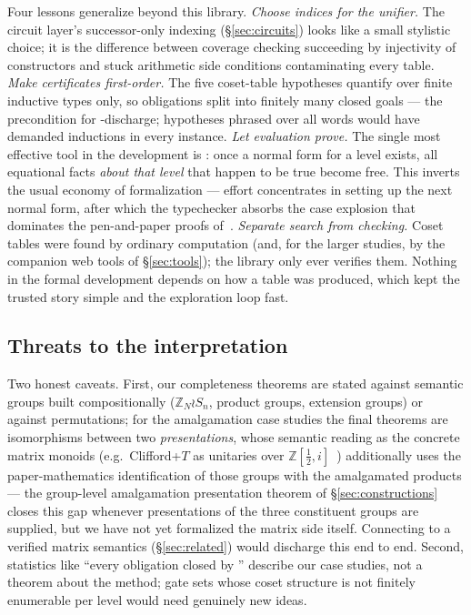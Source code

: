 Four lessons generalize beyond this library.  \emph{Choose indices for
the unifier.}  The circuit layer's successor-only indexing
(\S\ref{sec:circuits}) looks like a small stylistic choice; it is the
difference between coverage checking succeeding by injectivity of
constructors and stuck arithmetic side conditions contaminating every
table.  \emph{Make certificates first-order.}  The five coset-table
hypotheses quantify over finite inductive types only, so obligations
split into finitely many closed goals --- the precondition for
-discharge; hypotheses phrased over all words would have
demanded inductions in every instance.  \emph{Let evaluation prove.}
The single most effective tool in the development is
: once a normal form for a level exists, all
equational facts \emph{about that level} that happen to be true become
free.  This inverts the usual economy of formalization --- effort
concentrates in setting up the next normal form, after which the
typechecker absorbs the case explosion that dominates the pen-and-paper
proofs of~\cite{selinger2015clifford,li2025qutrit,
clement2026realcliffordch}.  \emph{Separate search from checking.}  Coset
tables were found by ordinary computation (and, for the larger studies,
by the companion web tools of \S\ref{sec:tools}); the library only ever
verifies them.  Nothing in the formal development depends on how a table
was produced, which kept the trusted story simple and the exploration
loop fast.

\subsection{Threats to the interpretation}

Two honest caveats.  First, our completeness theorems are stated against
semantic groups built compositionally ($\mathbb{Z}_N \wr S_n$, product
groups, extension groups) or against permutations; for the amalgamation
case studies the final theorems are isomorphisms between two
\emph{presentations}, whose semantic reading as the concrete matrix
monoids (e.g.\ Clifford+$T$ as unitaries over
$\mathbb{Z}[\tfrac12,i]$~\cite{amy2020numbertheoretic,bian2021un})
additionally uses the paper-mathematics identification of those groups
with the amalgamated products --- the group-level amalgamation
presentation theorem of \S\ref{sec:constructions} closes this gap
whenever presentations of the three constituent groups are supplied, but
we have not yet formalized the matrix side itself.  Connecting to a
verified matrix semantics (\S\ref{sec:related}) would discharge this end
to end.  Second, statistics like ``every obligation closed by
'' describe our case studies, not a theorem about the method;
gate sets whose coset structure is not finitely enumerable per level
would need genuinely new ideas.
